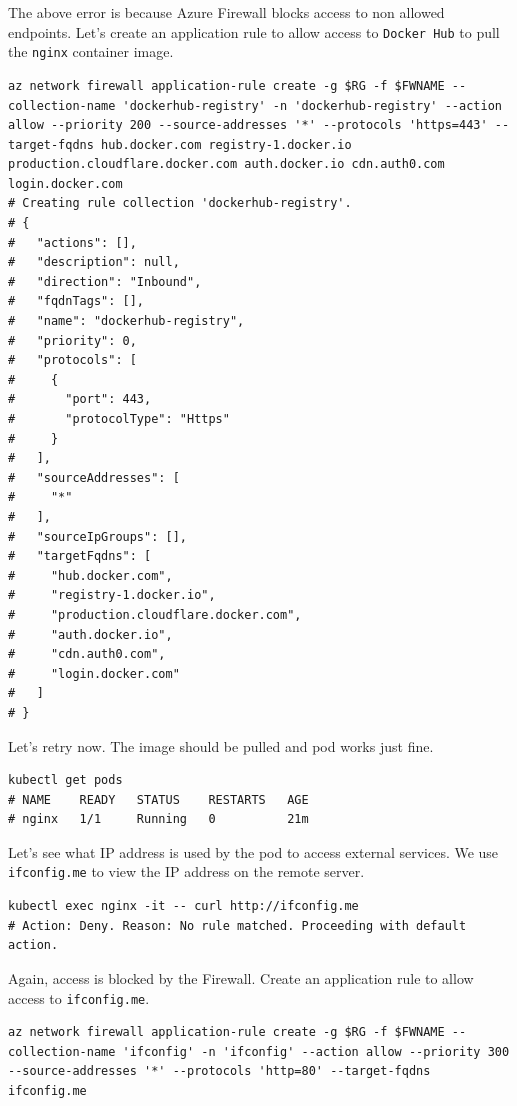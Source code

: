 \documentclass[
]{article}
\newcommand{\passthrough}[1]{#1}
\begin{document}
The above error is because Azure Firewall blocks access to non allowed
endpoints. Let's create an application rule to allow access to
\passthrough{\lstinline!Docker Hub!} to pull the
\passthrough{\lstinline!nginx!} container image.

\begin{lstlisting}
az network firewall application-rule create -g $RG -f $FWNAME --collection-name 'dockerhub-registry' -n 'dockerhub-registry' --action allow --priority 200 --source-addresses '*' --protocols 'https=443' --target-fqdns hub.docker.com registry-1.docker.io production.cloudflare.docker.com auth.docker.io cdn.auth0.com login.docker.com
# Creating rule collection 'dockerhub-registry'.
# {
#   "actions": [],
#   "description": null,
#   "direction": "Inbound",
#   "fqdnTags": [],
#   "name": "dockerhub-registry",
#   "priority": 0,
#   "protocols": [
#     {
#       "port": 443,
#       "protocolType": "Https"
#     }
#   ],
#   "sourceAddresses": [
#     "*"
#   ],
#   "sourceIpGroups": [],
#   "targetFqdns": [
#     "hub.docker.com",
#     "registry-1.docker.io",
#     "production.cloudflare.docker.com",
#     "auth.docker.io",
#     "cdn.auth0.com",
#     "login.docker.com"
#   ]
# }
\end{lstlisting}

Let's retry now. The image should be pulled and pod works just fine.

\begin{lstlisting}
kubectl get pods
# NAME    READY   STATUS    RESTARTS   AGE
# nginx   1/1     Running   0          21m
\end{lstlisting}

Let's see what IP address is used by the pod to access external
services. We use \passthrough{\lstinline!ifconfig.me!} to view the IP
address on the remote server.

\begin{lstlisting}
kubectl exec nginx -it -- curl http://ifconfig.me
# Action: Deny. Reason: No rule matched. Proceeding with default action.
\end{lstlisting}

Again, access is blocked by the Firewall. Create an application rule to
allow access to \passthrough{\lstinline!ifconfig.me!}.

\begin{lstlisting}
az network firewall application-rule create -g $RG -f $FWNAME --collection-name 'ifconfig' -n 'ifconfig' --action allow --priority 300 --source-addresses '*' --protocols 'http=80' --target-fqdns ifconfig.me
\end{lstlisting}
\end{document}
